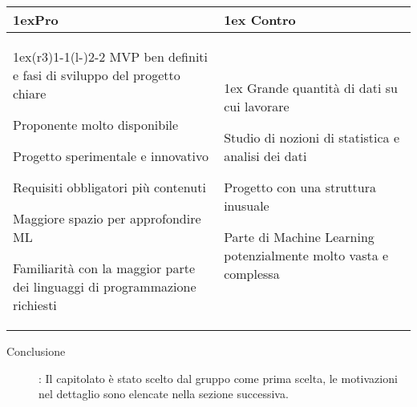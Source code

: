\begin{table}[h]
\begin{tabularx}{\linewidth}{>{\parskip1ex}X@{\kern4\tabcolsep}>{\parskip1ex}X}
\hfil\bfseries Pro
&
\hfil\bfseries Contro
\\\cmidrule(r{3\tabcolsep}){1-1}\cmidrule(l{-\tabcolsep}){2-2}
MVP ben definiti e fasi di sviluppo del progetto chiare \par
Proponente molto disponibile \par
Progetto sperimentale e innovativo \par
Requisiti obbligatori più contenuti \par 
Maggiore spazio per approfondire ML \par
Familiarità con la maggior parte dei linguaggi di programmazione richiesti
&
Grande quantità di dati su cui lavorare \par
Studio di nozioni di statistica e analisi dei dati \par
Progetto con una struttura inusuale \par
Parte di Machine Learning potenzialmente molto vasta e complessa \\
\end{tabularx}
\end{table}
\begin{description}
	\item [Conclusione]: Il capitolato è stato scelto dal gruppo come prima scelta, le motivazioni nel dettaglio sono elencate nella sezione successiva.
\end{description}

\vspace{1cm}

